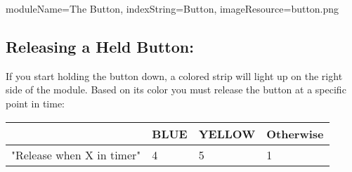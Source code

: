 \begin{module}{
  moduleName=The Button,
  indexString=Button,
  imageResource=button.png
}
  \subsection*{Releasing a Held Button:}
  If you start holding the button down, a colored strip will light up on the
  right side of the module. Based on its color you must release the button at
  a specific point in time:

  \begin{NiceTabular}{|
      >{\centering\arraybackslash}p{4cm} |
      >{\centering\arraybackslash}p{3.9cm} |
      >{\centering\arraybackslash}p{3.5cm} |
      >{\centering\arraybackslash}p{3.5cm} |}
    \hline
     &
    BLUE &
    YELLOW &
    Otherwise \\

    \hline
    "Release when X in timer" &
    \vspace{0cm}4 &
    \vspace{0cm}5 &
    \vspace{0cm}1 \\
    \hline
  \end{NiceTabular}

\end{module}
